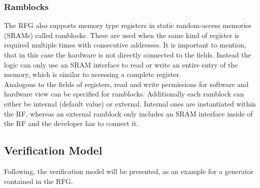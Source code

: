 \subsubsection{Ramblocks}\label{section::ramblocks}
The RFG also supports memory type registers in static random-access memories (SRAMs) called ramblocks. These are used when the same kind of register is required multiple times with consecutive addresses. It is important to mention, that in this case the hardware is not directly connected to the fields. Instead the logic can only use an SRAM interface to read or write an entire entry of the memory, which is similar to accessing a complete register.\\
Analogous to the fields of registers, read and write permissions for software and hardware view can be specified for ramblocks. Additionally each ramblock can either be internal (default value) or external. Internal ones are instantiated within the RF, whereas an external ramblock only includes an SRAM interface inside of the RF and the developer has to connect it.
\subsection{Verification Model}
Following, the verification model will be presented, as an example for a generator contained in the RFG.
